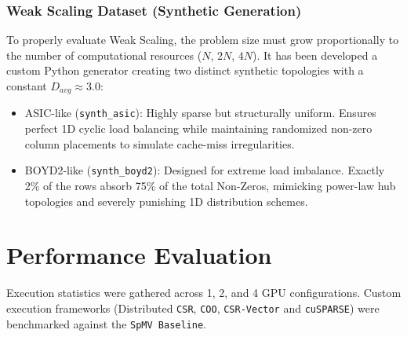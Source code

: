 \documentclass[conference]{IEEEtran}
\begin{document}
\subsubsection{Weak Scaling Dataset (Synthetic Generation)}
To properly evaluate Weak Scaling, the problem size must grow proportionally to the number of computational resources ($N$, $2N$, $4N$). It has been developed a custom Python generator creating two distinct synthetic topologies with a constant $D_{avg} \approx 3.0$:
\begin{itemize}
    \item ASIC-like (\texttt{synth\_asic}): Highly sparse but structurally uniform. Ensures perfect 1D cyclic load balancing while maintaining randomized non-zero column placements to simulate cache-miss irregularities.
    \item BOYD2-like (\texttt{synth\_boyd2}): Designed for extreme load imbalance. Exactly 2\% of the rows absorb 75\% of the total Non-Zeros, mimicking power-law hub topologies and severely punishing 1D distribution schemes.
\end{itemize}

\begin{table}[htbp]
\caption{Synthetic Datasets (Weak Scaling Configurations)}
\label{tab:dataset-syth}
\centering
{}
\end{table}
\section{Performance Evaluation}
Execution statistics were gathered across 1, 2, and 4 GPU configurations. Custom execution frameworks (Distributed \texttt{CSR}, \texttt{COO}, \texttt{CSR-Vector} and \texttt{cuSPARSE}) were benchmarked against the \texttt{SpMV Baseline}. 
\end{document}
